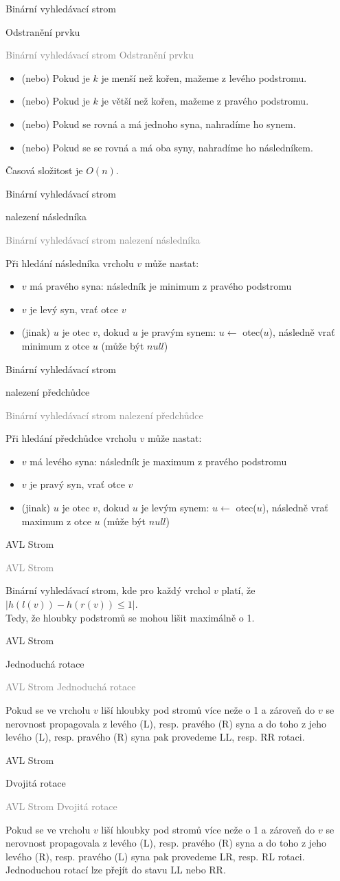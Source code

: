 \documentclass[20pt]{extarticle}
\newcommand{\card}[3][]{
	\vspace*{\fill}

	\newpage
	\topskip0pt
	\vspace*{\fill}
		\Large #2

		\vspace{1cm}
		\normalsize #1
	\vspace*{\fill}
	\newpage

	\small \textcolor{gray}{#2 #1}
	\topskip0pt
	\vspace*{\fill}

	\normalsize
	#3
	\vspace*{\fill}
}
\begin{document}
\begin{center}
\card[Odstranění prvku]{Binární vyhledávací strom}{
	\small
	\begin{itemize}
		\item (nebo) Pokud je $k$ je menší než kořen, mažeme z levého podstromu.
		\item (nebo) Pokud je $k$ je větší než kořen, mažeme z pravého podstromu.
		\item (nebo) Pokud se rovná a má jednoho syna, nahradíme ho synem.
		\item (nebo) Pokud se se rovná a má oba syny, nahradíme ho následníkem.
	\end{itemize}
	Časová složitost je $O(n)$.
}

\card[nalezení následníka]{Binární vyhledávací strom}{
	\small
	Při hledání následníka vrcholu $v$ může nastat:
	\begin{itemize}
		\item $v$ má pravého syna: následník je minimum z pravého podstromu
		\item $v$ je levý syn, vrať otce $v$
		\item (jinak) $u$ je otec $v$, dokud $u$ je pravým synem: $u \leftarrow$ otec($u$), následně vrať minimum z otce $u$ (může být $null$)
	\end{itemize}
}

\card[nalezení předchůdce]{Binární vyhledávací strom}{
	\small
	Při hledání předchůdce vrcholu $v$ může nastat:
	\begin{itemize}
		\item $v$ má levého syna: následník je maximum z pravého podstromu
		\item $v$ je pravý syn, vrať otce $v$
		\item (jinak) $u$ je otec $v$, dokud $u$ je levým synem: $u \leftarrow$ otec($u$), následně vrať maximum z otce $u$ (může být $null$)
	\end{itemize}
}

\card{AVL Strom}{
	Binární vyhledávací strom, kde pro každý vrchol $v$ platí, že\\
	$|h(l(v)) - h(r(v)) \leq 1|$.\\
	Tedy, že hloubky podstromů se mohou lišit maximálně o 1.
}

\card[Jednoduchá rotace]{AVL Strom}{
	Pokud se ve vrcholu $v$ liší hloubky pod stromů více neže o 1 a zároveň
	do $v$ se nerovnost propagovala z levého (L), resp. pravého (R) syna a do toho
	z jeho levého (L), resp. pravého (R) syna pak provedeme LL, resp. RR rotaci.
}

\card[Dvojitá rotace]{AVL Strom}{
	Pokud se ve vrcholu $v$ liší hloubky pod stromů více neže o 1 a zároveň
	do $v$ se nerovnost propagovala z levého (L), resp. pravého (R) syna a do toho
	z jeho levého (R), resp. pravého (L) syna pak provedeme LR, resp. RL rotaci.
	Jednoduchou rotací lze přejít do stavu LL nebo RR.
}


\end{center}
\end{document}
